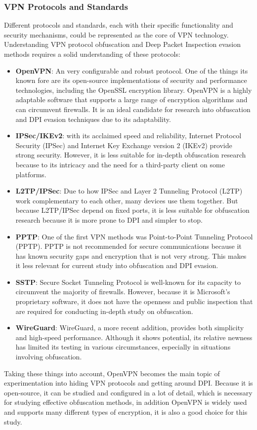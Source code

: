 \documentclass[12pt, fleqn, a4paper]{article}
\begin{document}
\subsubsection{VPN Protocols and Standards}
Different protocols and standards, each with their specific functionality and security mechanisms, could be represented as the core of VPN technology. Understanding VPN protocol obfuscation and Deep Packet Inspection evasion methods requires a solid understanding of these protocols:
\begin{itemize}
  \item \textbf{OpenVPN}: An very configurable and robust protocol. One of the things its known fore are its open-source implementations of security and performance technologies, including the OpenSSL encryption library. OpenVPN is a highly adaptable software that supports a large range of encryption algorithms and can circumvent firewalls. It is an ideal candidate for research into obfuscation and DPI evasion techniques due to its adaptability.
  \item \textbf{IPSec/IKEv2}: with its acclaimed speed and reliability, Internet Protocol Security (IPSec) and Internet Key Exchange version 2 (IKEv2) provide strong security. However, it is less suitable for in-depth obfuscation research because to its intricacy and the need for a third-party client on some platforms. \citep{ipsec}
  \item \textbf{L2TP/IPSec}: Due to how IPSec and Layer 2 Tunneling Protocol (L2TP) work complementary to each other, many devices use them together. But because L2TP/IPSec depend on fixed ports, it is less suitable for obfuscation research because it is more prone to DPI and simpler to stop.
  \item \textbf{PPTP}: One of the first VPN methods was Point-to-Point Tunneling Protocol (PPTP). PPTP is not recommended for secure communications because it has known security gaps and encryption that is not very strong. This makes it less relevant for current study into obfuscation and DPI evasion.
  \item \textbf{SSTP}: Secure Socket Tunneling Protocol is well-known for its capacity to circumvent the majority of firewalls. However, because it is Microsoft's proprietary software, it does not have the openness and public inspection that are required for conducting in-depth study on obfuscation. \citep{sstp}
  \item \textbf{WireGuard}: WireGuard, a more recent addition, provides both simplicity and high-speed performance. Although it shows potential, its relative newness has limited its testing in various circumstances, especially in situations involving obfuscation. \citep{wireguard}
\end{itemize}
Taking these things into account, OpenVPN becomes the main topic of experimentation into hiding VPN protocols and getting around DPI. Because it is open-source, it can be studied and configured in a lot of detail, which is necessary for studying effective obfuscation methods, in addition OpenVPN is widely used and supports many different types of encryption, it is also a good choice for this study.
\end{document}

